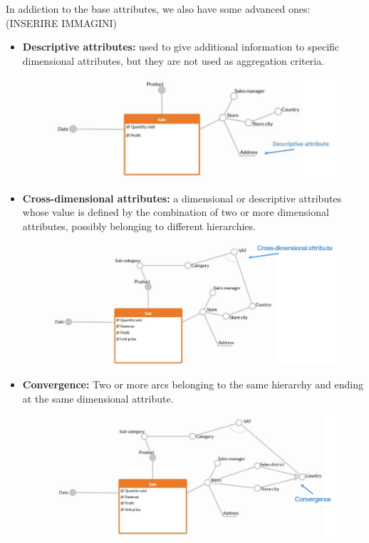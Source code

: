 In addiction to the base attributes, we also have some advanced ones: (INSERIRE IMMAGINI)
\begin{itemize}
    \item \textbf{Descriptive attributes:} used to give additional information to specific dimensional attributes, but they are not used as aggregation criteria.
    \begin{figure}[ht!]
        \centering
        \includegraphics[scale=0.66]{images/DFM_descriptive_attributes.png}
    \end{figure}
    \item \textbf{Cross-dimensional attributes:} a dimensional or descriptive attributes whose value is defined by the combination of two or more dimensional attributes, possibly belonging to different hierarchies.
    \begin{figure}[ht!]
        \centering
        \includegraphics[scale=0.65]{images/DFM_cross_dimensional_attributes.png}
    \end{figure}
    \item \textbf{Convergence:} Two or more arcs belonging to the same hierarchy and ending at the same dimensional attribute.
    \begin{figure}[ht!]
        \centering
        \includegraphics[scale=0.65]{images/DFM_convergence.png}

\end{figure}
\end{itemize}
